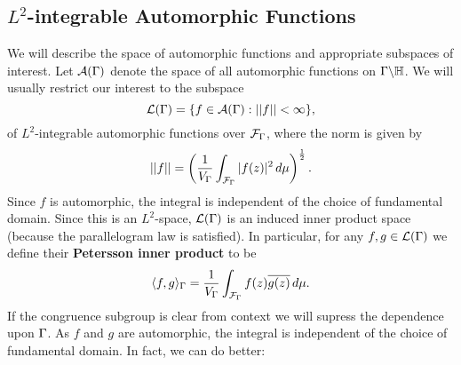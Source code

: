     \subsection*{\texorpdfstring{$L^{2}$}{L^{2}}-integrable Automorphic Functions}
      We will describe the space of automorphic functions and appropriate subspaces of interest. Let $\mathcal{A}(\Gamma)$ denote the space of all automorphic functions on $\Gamma\backslash\mathbb{H}$. We will usually restrict our interest to the subspace
      \[
        \mathcal{L}(\Gamma) = \{f \in \mathcal{A}(\Gamma):||f|| < \infty\},
      \]
      of $L^{2}$-integrable automorphic functions over $\mathcal{F}_{\Gamma}$, where the norm is given by
      \[
        ||f|| = \left(\frac{1}{V_{\Gamma}}\int_{\mathcal{F}_{\Gamma}}|f(z)|^{2}\,d\mu\right)^{\frac{1}{2}}.
      \]
      Since $f$ is automorphic, the integral is independent of the choice of fundamental domain. Since this is an $L^{2}$-space, $\mathcal{L}(\Gamma)$ is an induced inner product space (because the parallelogram law is satisfied). In particular, for any $f,g \in \mathcal{L}(\Gamma)$ we define their \textbf{Petersson inner product} to be
      \[
        \langle f,g\rangle_{\Gamma} = \frac{1}{V_{\Gamma}}\int_{\mathcal{F}_{\Gamma}}f(z)\overline{g(z)}\,d\mu.
      \]
      If the congruence subgroup is clear from context we will supress the dependence upon $\Gamma$. As $f$ and $g$ are automorphic, the integral is independent of the choice of fundamental domain. In fact, we can do better:

